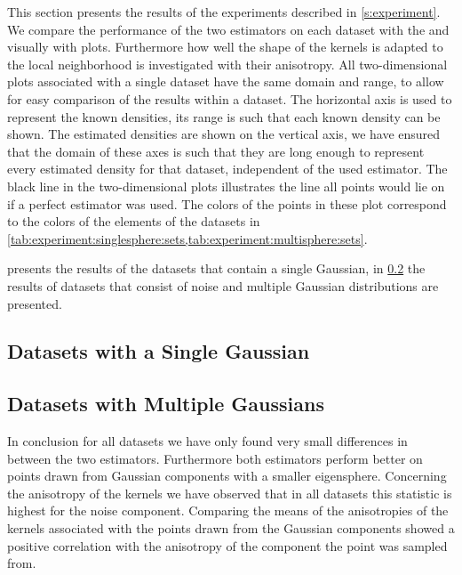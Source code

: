 
This section presents the results of the experiments described in \cref{s:experiment}. 
We compare the performance of the two estimators on each dataset with the \mse and visually with plots. Furthermore how well the shape of the kernels is adapted to the local neighborhood is investigated with their anisotropy.
	All two-dimensional plots associated with a single dataset have the same domain and range, to allow for easy comparison of the results within a dataset. The horizontal axis is used to represent the known densities, its range is such that each known density can be shown. The estimated densities are shown on the vertical axis, we have ensured that the domain of these axes is such that they are long enough to represent every estimated density for that dataset, independent of the used estimator. 
	The black line in the two-dimensional plots illustrates the line all points would lie on if a perfect estimator was used.
	The colors of the points in these plot correspond to the colors of the elements of the datasets in \cref{tab:experiment:singlesphere:sets,tab:experiment:multisphere:sets}.

	 presents the results of the datasets that contain a single Gaussian, in \cref{s:results:multipleGaussian} the results of datasets that consist of noise and multiple Gaussian distributions are presented. 

\subsection{Datasets with a Single Gaussian}
\label{s:results:singleGaussian}


\subsection{Datasets with Multiple Gaussians}
\label{s:results:multipleGaussian}


	In conclusion for all datasets we have only found very small differences in \mse between the two estimators. 
	Furthermore both estimators perform better on points drawn from Gaussian components with a smaller eigensphere. 
	Concerning the anisotropy of the kernels we have observed that in all datasets this statistic is highest for the noise component. 
	Comparing the means of the anisotropies of the kernels associated with the points drawn from the Gaussian components showed a positive correlation with the anisotropy of the component the point was sampled from. 